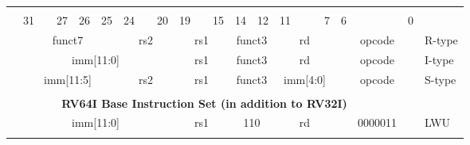 \begin{table}[p]
\begin{small}
\begin{center}
    \begin{tabular} {p{0.002in}p{0.002in}p{0.002in}p{0.002in}p{0.002in}p{0.002in}p{0.002in}p{0.002in}p{0.002in}p{0.002in}p{0.002in}p{0.002in}p{0.002in}p{0.002in}p{0.002in}p{0.002in}p{0.002in}p{0.002in}p{0.002in}p{0.002in}p{0.002in}p{0.002in}p{0.002in}p{0.002in}p{0.002in}p{0.002in}p{0.002in}p{0.002in}p{0.002in}p{0.002in}p{0.002in}p{0.002in}p{0.002in}l}
    & & & & & & & & & & & & & & & & & & & & & & & & & & & & & & & & \\

            &

    \multicolumn{3}{l}{31} &
    \multicolumn{2}{r}{27} &
    \multicolumn{1}{c}{26} &
    \multicolumn{1}{r}{25} &
    \multicolumn{3}{l}{24} &
    \multicolumn{2}{r}{20} &
    \multicolumn{3}{l}{19} &
    \multicolumn{2}{r}{15} &
    \multicolumn{2}{l}{14} &
    \multicolumn{1}{r}{12} &
    \multicolumn{4}{l}{11} &
    \multicolumn{1}{r}{7} &
    \multicolumn{6}{l}{6} &
    \multicolumn{1}{r}{0} \\
    \cline{2-33}
&


\multicolumn{7}{|c|}{funct7} &
\multicolumn{5}{c|}{rs2} &
\multicolumn{5}{c|}{rs1} &
\multicolumn{3}{c|}{funct3} &
\multicolumn{5}{c|}{rd} &
\multicolumn{7}{|c|}{opcode} & R-type \\
\cline{2-33}
&

\multicolumn{12}{|c|}{imm[11:0]} &
\multicolumn{5}{c|}{rs1} &
\multicolumn{3}{c|}{funct3} &
\multicolumn{5}{c|}{rd} &
\multicolumn{7}{|c|}{opcode} & I-type \\
\cline{2-33}
&

\multicolumn{7}{|c|}{imm[11:5]} &
\multicolumn{5}{c|}{rs2} &
\multicolumn{5}{c|}{rs1} &
\multicolumn{3}{c|}{funct3} &
\multicolumn{5}{c|}{imm[4:0]} &
\multicolumn{7}{|c|}{opcode} & S-type \\
\cline{2-33}
&




\multicolumn{32}{c}{} & \\
\multicolumn{32}{c}{\bf RV64I Base Instruction Set (in addition to RV32I) } & \\
\cline{2-33}

            &
\multicolumn{12}{|c|}{imm[11:0]} &
\multicolumn{5}{c|}{rs1} &
\multicolumn{3}{c|}{110} &
\multicolumn{5}{c|}{rd} &
\multicolumn{7}{|c|}{0000011} & LWU \\
\cline{2-33}
&


\end{tabular}
\end{center}
\end{small}
\end{table}
